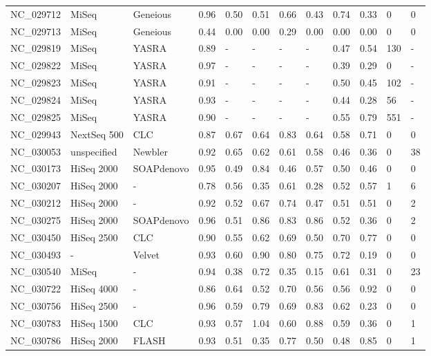 \begin{table}[ht]
\begin{tabular}{llllllllllll}
  NC\_029712 & MiSeq & Geneious & 0.96 & 0.50 & 0.51 & 0.66 & 0.43 & 0.74 & 0.33 &   0 &     0 \\ 
  NC\_029713 & MiSeq & Geneious & 0.44 & 0.00 & 0.00 & 0.29 & 0.00 & 0.00 & 0.00 &   0 &     0 \\ 
  NC\_029819 & MiSeq & YASRA & 0.89 & - & - & - & - & 0.47 & 0.54 & 130 & - \\ 
  NC\_029822 & MiSeq & YASRA & 0.97 & - & - & - & - & 0.39 & 0.29 &   0 & - \\ 
  NC\_029823 & MiSeq & YASRA & 0.91 & - & - & - & - & 0.50 & 0.45 & 102 & - \\ 
  NC\_029824 & MiSeq & YASRA & 0.93 & - & - & - & - & 0.44 & 0.28 &  56 & - \\ 
  NC\_029825 & MiSeq & YASRA & 0.90 & - & - & - & - & 0.55 & 0.79 & 551 & - \\ 
  NC\_029943 & NextSeq 500 & CLC & 0.87 & 0.67 & 0.64 & 0.83 & 0.64 & 0.58 & 0.71 &   0 &     0 \\ 
  NC\_030053 & unspecified & Newbler & 0.92 & 0.65 & 0.62 & 0.61 & 0.58 & 0.46 & 0.36 &   0 &    38 \\ 
  NC\_030173 & HiSeq 2000 & SOAPdenovo & 0.95 & 0.49 & 0.84 & 0.46 & 0.57 & 0.50 & 0.46 &   0 &     0 \\ 
  NC\_030207 & HiSeq 2000 & - & 0.78 & 0.56 & 0.35 & 0.61 & 0.28 & 0.52 & 0.57 &   1 &     6 \\ 
  NC\_030212 & HiSeq 2000 & - & 0.92 & 0.52 & 0.67 & 0.74 & 0.47 & 0.51 & 0.51 &   0 &     2 \\ 
  NC\_030275 & HiSeq 2000 & SOAPdenovo & 0.96 & 0.51 & 0.86 & 0.83 & 0.86 & 0.52 & 0.36 &   0 &     2 \\ 
  NC\_030450 & HiSeq 2500 & CLC & 0.90 & 0.55 & 0.62 & 0.69 & 0.50 & 0.70 & 0.77 &   0 &     0 \\ 
  NC\_030493 & - & Velvet & 0.93 & 0.60 & 0.90 & 0.80 & 0.75 & 0.72 & 0.19 &   0 &     0 \\ 
  NC\_030540 & MiSeq & - & 0.94 & 0.38 & 0.72 & 0.35 & 0.15 & 0.61 & 0.31 &   0 &    23 \\ 
  NC\_030722 & HiSeq 4000 & - & 0.86 & 0.64 & 0.52 & 0.70 & 0.56 & 0.56 & 0.92 &   0 &     0 \\ 
  NC\_030756 & HiSeq 2500 & - & 0.96 & 0.59 & 0.79 & 0.69 & 0.83 & 0.62 & 0.23 &   0 &     0 \\ 
  NC\_030783 & HiSeq 1500 & CLC & 0.93 & 0.57 & 1.04 & 0.60 & 0.88 & 0.59 & 0.36 &   0 &     1 \\ 
  NC\_030786 & HiSeq 2000 & FLASH & 0.93 & 0.51 & 0.35 & 0.77 & 0.50 & 0.48 & 0.85 &   0 &     1 \\ 

\end{tabular}
\end{table}
